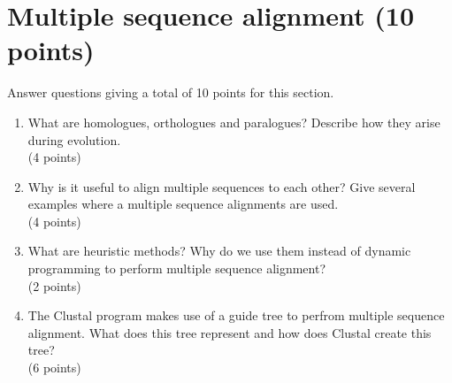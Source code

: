 \documentclass[11pt]{article}
\begin{document}
\section{Multiple sequence alignment (10 points)}
Answer questions giving a total of 10 points for this section.
\begin{enumerate}
\item What are homologues, orthologues and paralogues? Describe how they arise
  during evolution.\\
  (4 points)
\item Why is it useful to align multiple sequences to each other? Give several
  examples where a multiple sequence alignments are used.\\
  (4 points)
\item What are heuristic methods? Why do we use them instead of dynamic
  programming to perform multiple sequence alignment?\\
  (2 points)
\item The Clustal program makes use of a guide tree to perfrom multiple
  sequence alignment. What does this tree represent and how does Clustal
  create this tree?\\
  (6 points)
  
\end{enumerate}
\end{document}

